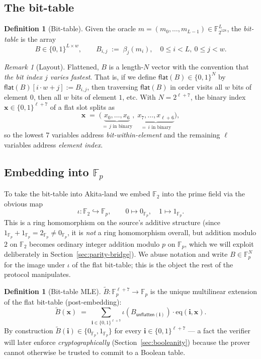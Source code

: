 \documentclass[11pt,a4paper]{article}
\theoremstyle{definition}
\newtheorem{definition}[theorem]{Definition}
\theoremstyle{remark}
\newtheorem{remark}[theorem]{Remark}
\newcommand{\binF}{\mathbb{F}_{2^{128}}}        %
\newcommand{\akF}{\mathbb{F}_{p}}                %
\newcommand{\GF}[1]{\mathbb{F}_{#1}}             %
\newcommand{\eq}{\mathrm{eq}}                    %
\newcommand{\MLE}[1]{\widetilde{#1}}              %
\newcommand{\BitTable}{B}                         %
\newcommand{\Message}{m}                          %
\newcommand{\bits}{\{0,1\}}
\begin{document}
\subsection{The bit-table}

\begin{definition}[Bit-table]
\label{def:bit-table}
Given the oracle $\Message = (\Message_0, \ldots, \Message_{L-1}) \in
\binF^L$, the \emph{bit-table} is the array
\[
  \BitTable \in \bits^{L \times w},
  \qquad
  \BitTable_{i,j} \;:=\; \beta_j(\Message_i),
  \quad
  0 \le i < L,\ 0 \le j < w.
\]
\end{definition}

\begin{remark}[Layout]
\label{rem:bit-table-layout}
Flattened, $\BitTable$ is a length-$N$ vector with the convention that
\emph{the bit index $j$ varies fastest}. That is, if we define
$\mathsf{flat}(B) \in \bits^N$ by $\mathsf{flat}(B)[i \cdot w + j] :=
\BitTable_{i,j}$, then traversing $\mathsf{flat}(B)$ in order visits all
$w$ bits of element $0$, then all $w$ bits of element $1$, etc. With
$N = 2^{\ell + 7}$, the binary index $\mathbf{x} \in \bits^{\ell + 7}$
of a flat slot splits as
\[
  \mathbf{x} \;=\; \bigl(\underbrace{x_0, \ldots, x_6}_{=\, j \text{ in
  binary}},\; \underbrace{x_7, \ldots, x_{\ell + 6}}_{=\, i \text{ in
  binary}}\bigr),
\]
so the lowest 7 variables address \emph{bit-within-element} and the
remaining $\ell$ variables address \emph{element index}.
\end{remark}

\subsection{Embedding into \texorpdfstring{$\akF$}{F\_p}}

To take the bit-table into Akita-land we embed $\GF{2}$ into the prime
field via the obvious map
\[
  \iota : \GF{2} \hookrightarrow \akF,
  \qquad 0 \mapsto 0_{\akF}, \quad 1 \mapsto 1_{\akF}.
\]
This is a ring homomorphism on the source's additive structure (since
$1_{\akF} + 1_{\akF} = 2_{\akF} \ne 0_{\akF}$, it is \emph{not} a ring
homomorphism overall, but addition modulo $2$ on $\GF{2}$ becomes
ordinary integer addition modulo $p$ on $\akF$, which we will exploit
deliberately in Section~\ref{sec:parity-bridge}). We abuse notation and
write $\BitTable \in \akF^N$ for the image under $\iota$ of the flat
bit-table; this is the object the rest of the protocol manipulates.

\begin{definition}[Bit-table MLE]
\label{def:bit-table-mle}
$\MLE{\BitTable} : \akF^{\ell + 7} \to \akF$ is the unique multilinear
extension of the flat bit-table (post-embedding):
\[
  \MLE{\BitTable}(\mathbf{x})
  \;=\; \sum_{\mathbf{i} \in \bits^{\ell + 7}}
        \iota(\BitTable_{\mathsf{unflatten}(\mathbf{i})})
        \cdot \eq(\mathbf{i}, \mathbf{x}).
\]
By construction $\MLE{\BitTable}(\mathbf{i}) \in \{0_{\akF}, 1_{\akF}\}$
for every $\mathbf{i} \in \bits^{\ell + 7}$ — a fact the verifier will
later enforce \emph{cryptographically} (Section~\ref{sec:booleanity})
because the prover cannot otherwise be trusted to commit to a Boolean
table.
\end{definition}
\end{document}

